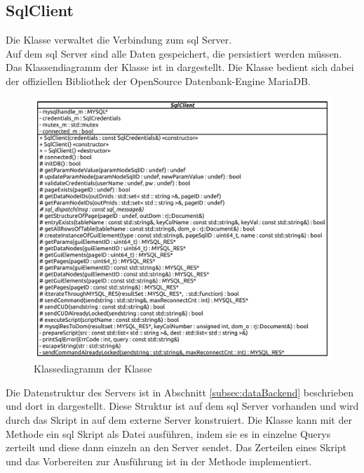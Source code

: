 \subsection{SqlClient}
Die  Klasse verwaltet die Verbindung zum \ac{sql} Server. \\Auf dem \ac{sql} Server sind alle Daten gespeichert, die persistiert werden müssen. 
Das Klassendiagramm der  Klasse ist in  dargestellt.
Die Klasse bedient sich dabei der offiziellen Bibliothek  der OpenSource Datenbank-Engine MariaDB.
\begin{figure}[ht]
  \centering
  \includegraphics[width=\textwidth]{content/hauptteil/umsetzungPoC/backend/uml/classesOfOverview/SqlClient.pdf}
  \caption{Klassediagramm der Klasse }
  \label{fig:backend:classDiag:SqlClient}
\end{figure}
Die Datenstruktur des Servers ist in Abschnitt \ref{subsec:dataBackend} beschrieben und dort in  dargestellt.
Diese Struktur ist auf dem \ac{sql} Server vorhanden und wird durch das Skript in  auf dem externe Server konstruiert.
Die  Klasse kann mit der Methode  ein \ac{sql} Skript als Datei ausführen, indem sie es in einzelne Querys zerteilt und diese dann einzeln an den Server sendet.
Das Zerteilen eines Skript und das Vorbereiten zur Ausführung ist in der Methode  implementiert. 
